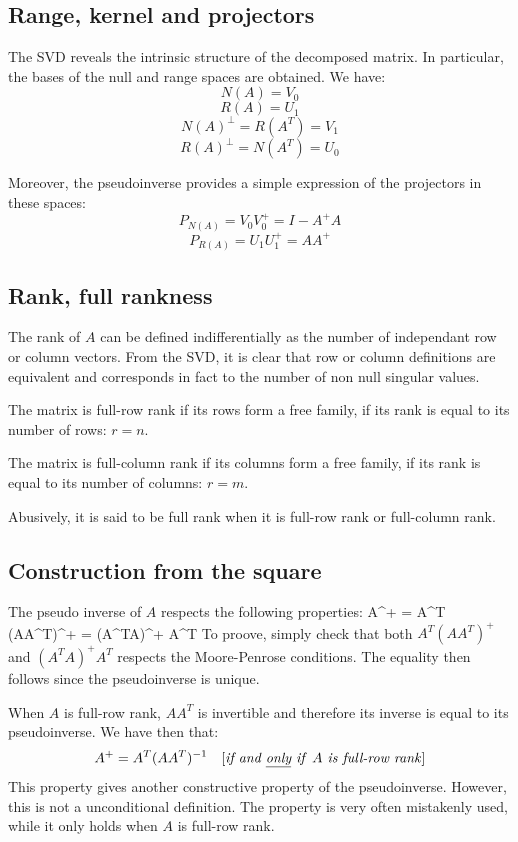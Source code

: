 \documentclass{book}
\begin{document}
\subsection{Range, kernel and projectors}
The SVD reveals the intrinsic structure of the decomposed matrix. In particular, the bases of the null and range spaces are obtained. We have:
$$ N(A) = V_0$$
$$ R(A) = U_1$$
$$ N(A)^\perp = R(A^T) = V_1 $$
$$ R(A)^\perp = N(A^T) = U_0$$

Moreover, the pseudoinverse provides a simple expression of the projectors in these spaces:
$$ P_{N(A)} = V_0 V_0^+ = I - A^+ A $$
$$ P_{R(A)} = U_1 U_1^+ = A A^+ $$

\subsection{Rank, full rankness}

The rank of $A$ can be defined indifferentially as the number of independant row or column vectors. From the SVD, it is clear that row or column definitions are equivalent and corresponds in fact to the number of non null singular values. 

The matrix is full-row rank if its rows form a free family, \mie if its rank is equal to its number of rows: $r=n$. 

The matrix is full-column rank if its columns form a free family, \mie if its rank is equal to its number of columns: $r=m$. 

Abusively, it is said to be full rank when it is full-row rank or full-column rank.

\subsection{Construction from the square} %
The pseudo inverse of $A$ respects the following properties:
 A^+  = A^T (AA^T)^+  = (A^TA)^+ A^T \EOUT
To proove, simply check that both $A^T (AA^T)^+$ and $(A^TA)^+ A^T$ respects the Moore-Penrose conditions. The equality then follows since the pseudoinverse is unique.

\medskip
When $A$ is full-row rank, $AA^T$ is invertible and therefore its inverse is equal to its pseudoinverse. We have then that:
$$ A^+ = A^T(AA^T)^{-1} \quad \textrm{[\emph{if and \underline{only} if }} A \textrm{\emph{ is full-row rank}]}$$
This property gives another constructive property of the pseudoinverse. However, this is not a unconditional definition. The property is very often mistakenly used, while it only holds when $A$ is full-row rank. 
\end{document}
